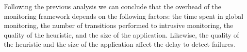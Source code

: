 Following the previous analysis we can conclude that the overhead of the monitoring framework depends on the following factors: the time spent in global monitoring, the number of transitions performed to intrusive monitoring, the quality of the heuristic, and the size of the application.
Likewise, the quality of the heuristic and the size of the application affect the delay to detect failures.

